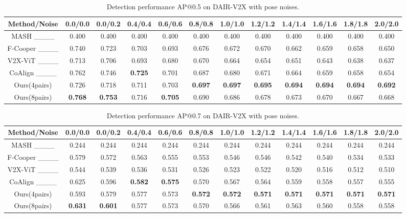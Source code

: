     \begin{table*}
  \caption{Detection performance AP@0.5 on DAIR-V2X with pose noises.}
  \label{table1}
  \begin{tabular}{c|ccccccccccc}
    \toprule
    Method/Noise & 0.0/0.0 & 0.0/0.2 & 0.4/0.4 & 0.6/0.6 & 0.8/0.8 & 1.0/1.0 & 1.2/1.2 & 1.4/1.4 & 1.6/1.6 & 1.8/1.8 & 2.0/2.0 \\
    \midrule
    MASH ____ & 0.400 & 0.400 & 0.400 & 0.400 & 0.400 & 0.400 & 0.400 & 0.400 & 0.400 & 0.400 & 0.400 \\
    F-Cooper ____& 0.740 & 0.723 & 0.703 & 0.693 & 0.676 & 0.672 & 0.670 & 0.662 & 0.659 & 0.658 & 0.650 \\
    V2X-ViT ____ & 0.713 & 0.706 & 0.693 & 0.680 & 0.670 & 0.664 & 0.654 & 0.651 & 0.643 & 0.638 & 0.637 \\
    CoAlign ____ & 0.762 & 0.746 & \textbf{0.725} & 0.701 & 0.687 & 0.680 & 0.671 & 0.664 & 0.659 & 0.658 & 0.654 \\
    Ours(4pairs)   & 0.726 & 0.718 & 0.711 & 0.703 & \textbf{0.697} & \textbf{0.697} & \textbf{0.695} & \textbf{0.694} & \textbf{0.694} & \textbf{0.694} & \textbf{0.692} \\
    Ours(8pairs) & \textbf{0.768} & \textbf{0.753} & 0.716 & \textbf{0.705} & 0.690 & 0.686 & 0.678 & 0.673 & 0.670 & 0.667 & 0.668 \\
    \bottomrule
  \end{tabular}
\end{table*}


\begin{table*}
  \caption{Detection performance AP@0.7 on DAIR-V2X with pose noises.}
  \label{table2}
  \begin{tabular}{c|ccccccccccc}
    \toprule
    Method/Noise & 0.0/0.0 & 0.0/0.2 & 0.4/0.4 & 0.6/0.6 & 0.8/0.8 & 1.0/1.0 & 1.2/1.2 & 1.4/1.4 & 1.6/1.6 & 1.8/1.8 & 2.0/2.0 \\
    \midrule
    MASH ____ & 0.244 & 0.244 & 0.244 & 0.244 & 0.244 & 0.244 & 0.244 & 0.244 & 0.244 & 0.244 & 0.244 \\
    F-Cooper ____& 0.579 & 0.572 & 0.563 & 0.555 & 0.553 & 0.546 & 0.546 & 0.542 & 0.540 & 0.534 & 0.533 \\
    V2X-ViT ____ & 0.544 & 0.539 & 0.536 & 0.531 & 0.526 & 0.523 & 0.522 & 0.520 & 0.516 & 0.512 & 0.510 \\
    CoAlign ____ & 0.625 & 0.596 & \textbf{0.582} & \textbf{0.575} & 0.570 & 0.567 & 0.564 & 0.559 & 0.558 & 0.557 & 0.555 \\
    Ours(4pairs) & 0.593 & 0.579 & 0.577 & 0.573 & \textbf{0.572} & \textbf{0.572} & \textbf{0.571} & \textbf{0.571} & \textbf{0.571} & \textbf{0.571} & \textbf{0.571} \\
    Ours(8pairs) & \textbf{0.631} & \textbf{0.601} & 0.577 & 0.573 & 0.570 & 0.566 & 0.561 & 0.563 & 0.560 & 0.558 & 0.558 \\
    \bottomrule
  \end{tabular}
\end{table*}